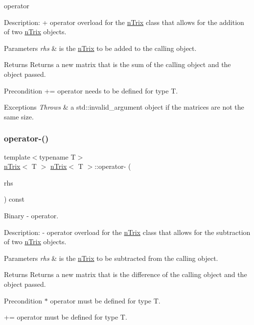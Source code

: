 \begin{DoxyItemize}
\item operator 
\end{DoxyItemize}

Description\+: + operator overload for the \hyperlink{classnTrix}{n\+Trix} class that allows for the addition of two \hyperlink{classnTrix}{n\+Trix} objects. 
\begin{DoxyParams}{Parameters}
{\em rhs} & is the \hyperlink{classnTrix}{n\+Trix} to be added to the calling object. \\
\hline
\end{DoxyParams}
\begin{DoxyReturn}{Returns}
Returns a new matrix that is the sum of the calling object and the object passed. 
\end{DoxyReturn}
\begin{DoxyPrecond}{Precondition}
+= operator needs to be defined for type T. 
\end{DoxyPrecond}

\begin{DoxyExceptions}{Exceptions}
{\em Throws} & a std\+::invalid\+\_\+argument object if the matrices are not the same size. \\
\hline
\end{DoxyExceptions}
\mbox{\label{classnTrix_af43db03d2939e1ccb8f218f3d55543e8}} 
\subsubsection{\texorpdfstring{operator-\/()}{operator-()}\hspace{0.1cm}{\footnotesize\ttfamily [1/2]}}
{\footnotesize\ttfamily template$<$typename T$>$ \\
\hyperlink{classnTrix}{n\+Trix}$<$ T $>$ \hyperlink{classnTrix}{n\+Trix}$<$ T $>$\+::operator-\/ (\begin{DoxyParamCaption}\item[{const \hyperlink{classnTrix}{n\+Trix}$<$ T $>$ \&}]{rhs }\end{DoxyParamCaption}) const}



Binary -\/ operator. 

Description\+: -\/ operator overload for the \hyperlink{classnTrix}{n\+Trix} class that allows for the subtraction of two \hyperlink{classnTrix}{n\+Trix} objects. 
\begin{DoxyParams}{Parameters}
{\em rhs} & is the \hyperlink{classnTrix}{n\+Trix} to be subtracted from the calling object. \\
\hline
\end{DoxyParams}
\begin{DoxyReturn}{Returns}
Returns a new matrix that is the difference of the calling object and the object passed. 
\end{DoxyReturn}
\begin{DoxyPrecond}{Precondition}
$\ast$ operator must be defined for type T. 

+= operator must be defined for type T. 
\end{DoxyPrecond}

